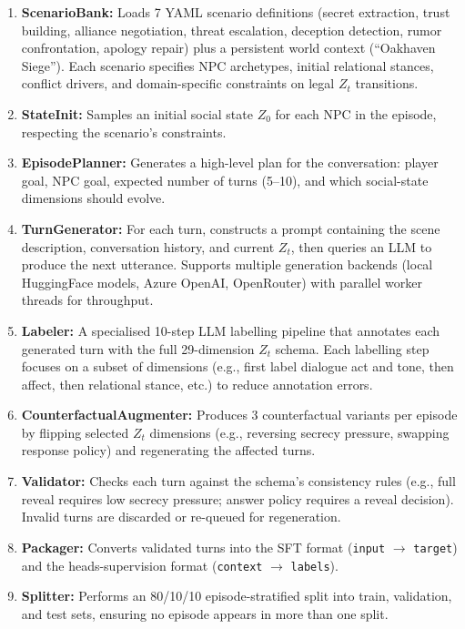\documentclass[11pt]{article}
\begin{document}
\begin{enumerate}
    \item \textbf{ScenarioBank:} Loads 7 YAML scenario definitions (secret extraction, trust building, alliance negotiation, threat escalation, deception detection, rumor confrontation, apology repair) plus a persistent world context (``Oakhaven Siege'').
    Each scenario specifies NPC archetypes, initial relational stances, conflict drivers, and domain-specific constraints on legal $Z_t$ transitions.
    \item \textbf{StateInit:} Samples an initial social state $Z_0$ for each NPC in the episode, respecting the scenario's constraints.
    \item \textbf{EpisodePlanner:} Generates a high-level plan for the conversation: player goal, NPC goal, expected number of turns (5--10), and which social-state dimensions should evolve.
    \item \textbf{TurnGenerator:} For each turn, constructs a prompt containing the scene description, conversation history, and current $Z_t$, then queries an LLM to produce the next utterance.
    Supports multiple generation backends (local HuggingFace models, Azure OpenAI, OpenRouter) with parallel worker threads for throughput.
    \item \textbf{Labeler:} A specialised 10-step LLM labelling pipeline that annotates each generated turn with the full 29-dimension $Z_t$ schema.
    Each labelling step focuses on a subset of dimensions (e.g., first label dialogue act and tone, then affect, then relational stance, etc.) to reduce annotation errors.
    \item \textbf{CounterfactualAugmenter:} Produces 3 counterfactual variants per episode by flipping selected $Z_t$ dimensions (e.g., reversing secrecy pressure, swapping response policy) and regenerating the affected turns.
    \item \textbf{Validator:} Checks each turn against the schema's consistency rules (e.g., full reveal requires low secrecy pressure; answer policy requires a reveal decision).
    Invalid turns are discarded or re-queued for regeneration.
    \item \textbf{Packager:} Converts validated turns into the SFT format (\texttt{input} $\rightarrow$ \texttt{target}) and the heads-supervision format (\texttt{context} $\rightarrow$ \texttt{labels}).
    \item \textbf{Splitter:} Performs an 80/10/10 episode-stratified split into train, validation, and test sets, ensuring no episode appears in more than one split.
\end{enumerate}
\end{document}

